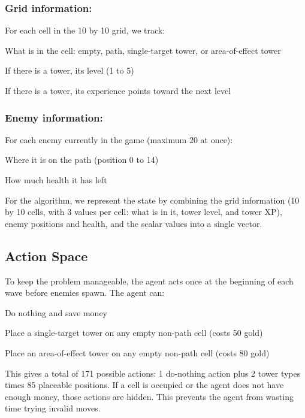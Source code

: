 \documentclass[12pt]{article}
\begin{document}
\subsubsection*{Grid information:}
For each cell in the 10 by 10 grid, we track:
\begin{compactitem}
\item What is in the cell: empty, path, single-target tower, or area-of-effect tower
\item If there is a tower, its level (1 to 5)
\item If there is a tower, its experience points toward the next level
\end{compactitem}

\subsubsection*{Enemy information:}
For each enemy currently in the game (maximum 20 at once):
\begin{compactitem}
\item Where it is on the path (position 0 to 14)
\item How much health it has left
\end{compactitem}

For the algorithm, we represent the state by combining the grid information (10 by 10 cells, with 3 values per cell: what is in it, tower level, and tower XP), enemy positions and health, and the scalar values into a single vector.

\subsection*{Action Space}

To keep the problem manageable, the agent acts once at the beginning of each wave before enemies spawn. The agent can:
\begin{compactitem}
\item Do nothing and save money
\item Place a single-target tower on any empty non-path cell (costs 50 gold)
\item Place an area-of-effect tower on any empty non-path cell (costs 80 gold)
\end{compactitem}

This gives a total of 171 possible actions: 1 do-nothing action plus 2 tower types times 85 placeable positions. If a cell is occupied or the agent does not have enough money, those actions are hidden. This prevents the agent from wasting time trying invalid moves.
\end{document}
